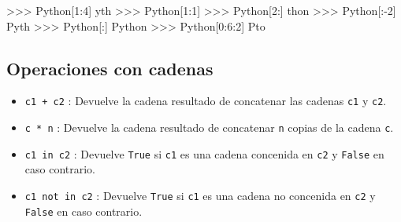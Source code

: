 \documentclass[
  spanish,
  a4paper,
]{scrreport}
\newenvironment{Shaded}{\begin{snugshade}}{\end{snugshade}}
\newcommand{\CommentTok}[1]{\textcolor[rgb]{0.37,0.37,0.37}{#1}}
\newcommand{\DecValTok}[1]{\textcolor[rgb]{0.68,0.00,0.00}{#1}}
\newcommand{\NormalTok}[1]{\textcolor[rgb]{0.00,0.23,0.31}{#1}}
\newcommand{\OperatorTok}[1]{\textcolor[rgb]{0.37,0.37,0.37}{#1}}
\newcommand{\StringTok}[1]{\textcolor[rgb]{0.13,0.47,0.30}{#1}}
\providecommand{\tightlist}{%
  \setlength{\itemsep}{0pt}\setlength{\parskip}{0pt}}
\begin{document}
\begin{Shaded}
\begin{Highlighting}[]
\OperatorTok{\textgreater{}\textgreater{}\textgreater{}} \StringTok{\textquotesingle{}Python\textquotesingle{}}\NormalTok{[}\DecValTok{1}\NormalTok{:}\DecValTok{4}\NormalTok{]}
\CommentTok{\textquotesingle{}yth\textquotesingle{}}
\OperatorTok{\textgreater{}\textgreater{}\textgreater{}} \StringTok{\textquotesingle{}Python\textquotesingle{}}\NormalTok{[}\DecValTok{1}\NormalTok{:}\DecValTok{1}\NormalTok{]}
\CommentTok{\textquotesingle{}\textquotesingle{}}
\OperatorTok{\textgreater{}\textgreater{}\textgreater{}} \StringTok{\textquotesingle{}Python\textquotesingle{}}\NormalTok{[}\DecValTok{2}\NormalTok{:]}
\CommentTok{\textquotesingle{}thon\textquotesingle{}}
\OperatorTok{\textgreater{}\textgreater{}\textgreater{}} \StringTok{\textquotesingle{}Python\textquotesingle{}}\NormalTok{[:}\OperatorTok{{-}}\DecValTok{2}\NormalTok{]}
\CommentTok{\textquotesingle{}Pyth\textquotesingle{}}
\OperatorTok{\textgreater{}\textgreater{}\textgreater{}} \StringTok{\textquotesingle{}Python\textquotesingle{}}\NormalTok{[:]}
\CommentTok{\textquotesingle{}Python\textquotesingle{}}
\OperatorTok{\textgreater{}\textgreater{}\textgreater{}} \StringTok{\textquotesingle{}Python\textquotesingle{}}\NormalTok{[}\DecValTok{0}\NormalTok{:}\DecValTok{6}\NormalTok{:}\DecValTok{2}\NormalTok{]}
\CommentTok{\textquotesingle{}Pto\textquotesingle{}}
\end{Highlighting}
\end{Shaded}

\subsection{Operaciones con cadenas}\label{operaciones-con-cadenas}

\begin{itemize}
\tightlist
\item
  \texttt{c1\ +\ c2} : Devuelve la cadena resultado de concatenar las
  cadenas \texttt{c1} y \texttt{c2}.
\item
  \texttt{c\ *\ n} : Devuelve la cadena resultado de concatenar
  \texttt{n} copias de la cadena \texttt{c}.
\item
  \texttt{c1\ in\ c2} : Devuelve \texttt{True} si \texttt{c1} es una
  cadena concenida en \texttt{c2} y \texttt{False} en caso contrario.
\item
  \texttt{c1\ not\ in\ c2} : Devuelve \texttt{True} si \texttt{c1} es
  una cadena no concenida en \texttt{c2} y \texttt{False} en caso
  contrario.
\end{itemize}
\end{document}
